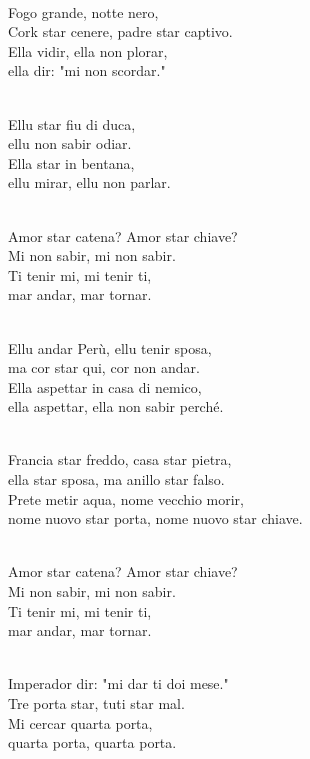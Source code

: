 \begin{lyrics}

\\
Fogo grande, notte nero,\\
Cork star cenere, padre star captivo.\\
Ella vidir, ella non plorar,\\
ella dir: "mi non scordar."

\\
Ellu star fiu di duca,\\
ellu non sabir odiar.\\
Ella star in bentana,\\
ellu mirar, ellu non parlar.

\\
Amor star catena? Amor star chiave?\\
Mi non sabir, mi non sabir.\\
Ti tenir mi, mi tenir ti,\\
mar andar, mar tornar.

\\
Ellu andar Perù, ellu tenir sposa,\\
ma cor star qui, cor non andar.
\\
Ella aspettar in casa di nemico,\\
ella aspettar, ella non sabir perché.

\\
Francia star freddo, casa star pietra,\\
ella star sposa, ma anillo star falso.
\\
Prete metir aqua, nome vecchio morir,\\
nome nuovo star porta, nome nuovo star chiave.

\\
Amor star catena? Amor star chiave?\\
Mi non sabir, mi non sabir.\\
Ti tenir mi, mi tenir ti,\\
mar andar, mar tornar.

\\
Imperador dir: "mi dar ti doi mese."\\
Tre porta star, tuti star mal.\\
Mi cercar quarta porta,\\
quarta porta, quarta porta.
\end{lyrics}

